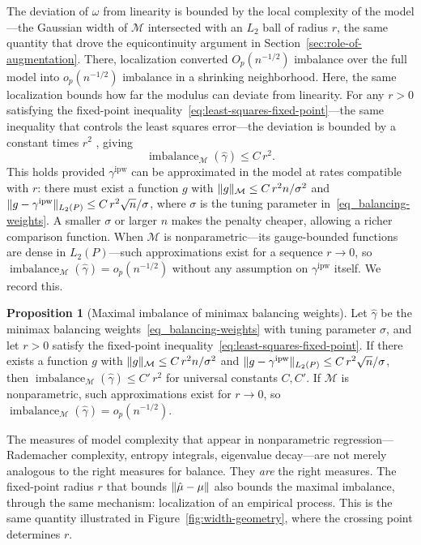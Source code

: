 \documentclass{article}
\DeclarePairedDelimiter\norm{\lVert}{\rVert}
\theoremstyle{definition}
\newtheorem{proposition}[theorem]{Proposition}
\newcommand{\ipw}{\text{ipw}}
\DeclareMathOperator{\imbalance}{imbalance}
\newcommand{\hgamma}{\ensuremath{\hat\gamma}}
\newcommand{\gammaipw}{\ensuremath{\gamma^{\ipw}}}
\newcommand{\model}{\mathcal{M}}
\newcommand{\<}{\langle}
\renewcommand{\>}{\rangle}
\begin{document}
The deviation of $\omega$ from linearity is bounded by the local complexity of the model---the Gaussian width of $\model$ intersected with an $L_2$ ball of radius $r$, the same quantity that drove the equicontinuity argument in Section~\ref{sec:role-of-augmentation}. There, localization converted $O_p(n^{-1/2})$ imbalance over the full model into $o_p(n^{-1/2})$ imbalance in a shrinking neighborhood. Here, the same localization bounds how far the modulus can deviate from linearity. For any $r > 0$ satisfying the fixed-point inequality~\eqref{eq:least-squares-fixed-point}---the same inequality that controls the least squares error---the deviation is bounded by a constant times $r^2$ \citep{kong2025asymptotics, hirshberg2025bregman}, giving
\begin{equation}
\label{eq:balance-fixed-point}
\imbalance_\model(\hgamma) \le C\, r^2.
\end{equation}
This holds provided $\gammaipw$ can be approximated in the model at rates compatible with $r$: there must exist a function $g$ with $\norm{g}_\model \le C\, r^2 n / \sigma^2$ and $\norm{g - \gammaipw}_{L_2(P)} \le C\, r^2 \sqrt{n}/\sigma$, where $\sigma$ is the tuning parameter in~\eqref{eq_balancing-weights}. A smaller $\sigma$ or larger $n$ makes the penalty cheaper, allowing a richer comparison function. When $\model$ is nonparametric---its gauge-bounded functions are dense in $L_2(P)$---such approximations exist for a sequence $r \to 0$, so $\imbalance_\model(\hgamma) = o_p(n^{-1/2})$ without any assumption on $\gammaipw$ itself. We record this.

\begin{proposition}[Maximal imbalance of minimax balancing weights]
\label{prop:bias-balance}
Let $\hgamma$ be the minimax balancing weights~\eqref{eq_balancing-weights} with tuning parameter $\sigma$,
and let $r > 0$ satisfy the fixed-point inequality~\eqref{eq:least-squares-fixed-point}. If there exists a function $g$ with $\norm{g}_\model \le C\, r^2 n / \sigma^2$ and $\norm{g - \gammaipw}_{L_2(P)} \le C\, r^2 \sqrt{n}/\sigma$, then $\imbalance_\model(\hgamma) \le C'\, r^2$ for universal constants $C, C'$. If $\model$ is nonparametric, such approximations exist for $r \to 0$, so $\imbalance_\model(\hgamma) = o_p(n^{-1/2})$.
\end{proposition}

The measures of model complexity that appear in nonparametric regression---Rademacher complexity, entropy integrals, eigenvalue decay---are not merely analogous to the right measures for balance. They \emph{are} the right measures. The fixed-point radius $r$ that bounds $\norm{\hat\mu - \mu}$ also bounds the maximal imbalance, through the same mechanism: localization of an empirical process. This is the same quantity illustrated in Figure~\ref{fig:width-geometry}, where the crossing point determines $r$.
\end{document}
